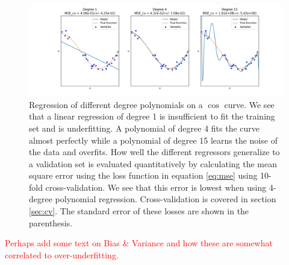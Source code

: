 \begin{figure}[h!]
    \centering
    \includegraphics[width=\textwidth,height=\textheight,keepaspectratio]{reg_example.png}
    \caption{Regression of different degree polynomials on a $\cos$ curve. We see that a linear regression of degree 1 is insufficient to fit the training set and is underfitting. A polynomial of degree 4 fits the curve almost perfectly while a polynomial of degree 15 learns the noise of the data and overfits. How well the different regressors generalize to a validation set is evaluated quantitatively by calculating the mean square error using the loss function in equation \ref{eq:mse} using 10-fold cross-validation. We see that this error is lowest when using 4-degree polynomial regression. Cross-validation is covered in section \ref{sec:cv}. The standard error of these losses are shown in the parenthesis.}
    \label{fig:regr_example}
\end{figure}
\noindent
\textcolor{red}{Perhaps add some text on Bias \& Variance and how these are somewhat correlated to over-underfitting.}

